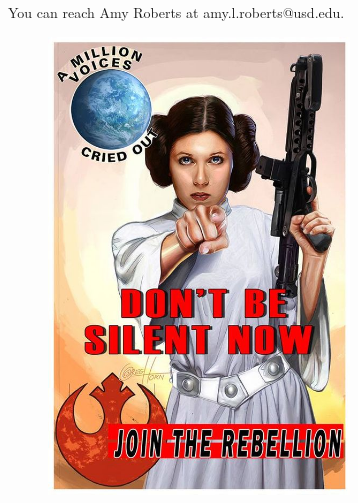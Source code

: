 \documentclass[]{report}   %
\begin{document}
You can reach Amy Roberts at amy.l.roberts@usd.edu.

\vspace*{\fill}
{
\begin{figure}[h]
\includegraphics[width=8cm]{mascot.jpg}
\centering
\end{figure}
}
\vspace*{\fill}
\end{document}
